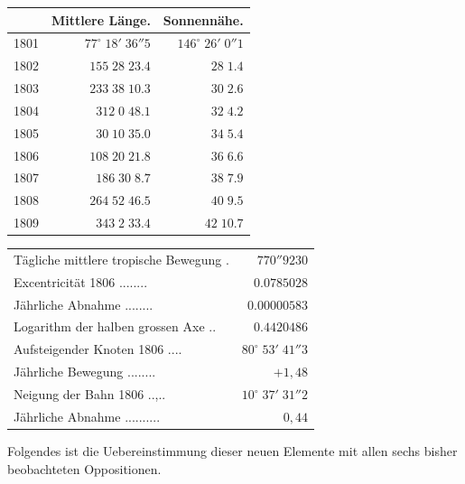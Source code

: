 \begin{center}\fontsize{10}{12}\selectfont\setlength{\tabcolsep}{5pt}\renewcommand{\arraystretch}{1.15}\begin{tabular}{crr}  & Mittlere Länge. & Sonnennähe.\\\hline 1801 & $77^\circ\;18'\;36''5$ & $146^\circ\;26'\;0''1$\\ 1802 & $155\;28\;23.4$ & $\phantom{146}\;28\;1.4$\\ 1803 & $233\;38\;10.3$ & $\phantom{146}\;30\;2.6$\\ 1804 & $312\;0\;48.1$ & $\phantom{146}\;32\;4.2$\\ 1805 & $30\;10\;35.0$ & $\phantom{146}\;34\;5.4$\\ 1806 & $108\;20\;21.8$ & $\phantom{146}\;36\;6.6$\\ 1807 & $186\;30\;8.7$ & $\phantom{146}\;38\;7.9$\\ 1808 & $264\;52\;46.5$ & $\phantom{146}\;40\;9.5$\\ 1809 & $343\;2\;33.4$ & $\phantom{146}\;42\;10.7$\\
\end{tabular}\end{center}

\begin{center}\fontsize{9}{11}\selectfont\setlength{\tabcolsep}{5pt}\renewcommand{\arraystretch}{1.15}\begin{tabular}{lr} Tägliche mittlere tropische Bewegung .\; & $770''9230$\\ Excentricität 1806 .\;.\;.\;.\;.\;.\;.\;.\; & $0.0785028$\\ Jährliche Abnahme .\;.\;.\;.\;.\;.\;.\;.\; & $0.00000583$\\ Logarithm der halben grossen Axe .\;.\; & $0.4420486$\\ Aufsteigender Knoten 1806 .\;.\;.\;.\; & $80^\circ\;53'\;41''3$\\ Jährliche Bewegung .\;.\;.\;.\;.\;.\;.\;.\; & $+1{,}48$\\ Neigung der Bahn 1806 .\;.\;,\;.\;.\; & $10^\circ\;37'\;31''2$\\ Jährliche Abnahme .\;.\;.\;.\;.\;.\;.\;.\;.\;.\; & $0{,}44$\\
\end{tabular}\end{center}


\par\indent Folgendes ist die Uebereinstimmung dieser neuen Elemente mit allen sechs bisher beobachteten Oppositionen.

